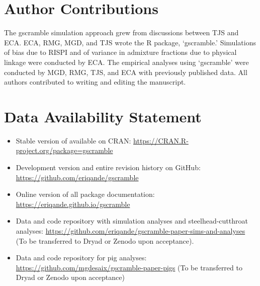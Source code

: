 \section*{Author Contributions}

The gscramble simulation approach grew from discussions between TJS and ECA\@.
ECA, RMG, MGD, and TJS wrote the R package, `gscramble.'   Simulations of bias due to RISPI and
of variance in admixture fractions due to physical linkage were conducted by ECA.
The empirical analyses using `gscramble' were conducted by MGD, RMG, TJS, and ECA with previously published data.
All authors contributed to writing and editing the manuscript.

\section*{Data Availability Statement}

\begin{itemize}
\item Stable version of \gscramble{} available on CRAN: \url{https://CRAN.R-project.org/package=gscramble}
\item Development version and entire revision history on GitHub: \url{https://github.com/eriqande/gscramble}
\item Online version of all package documentation: \url{https://eriqande.github.io/gscramble}
\item Data and code repository with simulation analyses and steelhead-cutthroat analyses: \url{https://github.com/eriqande/gscramble-paper-sims-and-analyses} (To be transferred to Dryad or Zenodo upon acceptance).
\item Data and code repository for pig analyses: \url{https://github.com/mgdesaix/gscramble-paper-pigs} (To be transferred to Dryad or Zenodo upon acceptance)
\end{itemize}
\mbox{}

